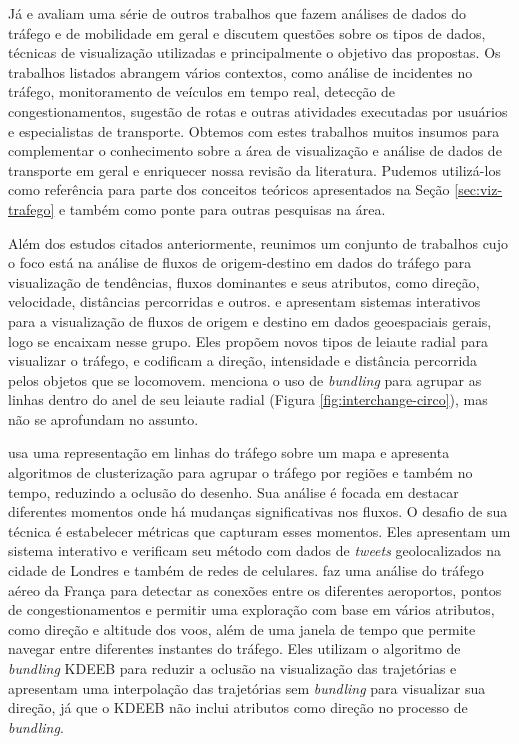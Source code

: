   Já \citet{Andrienko2017Visual} e \citet{Chen2015} avaliam uma série de outros
trabalhos que fazem análises de dados do tráfego e de mobilidade em geral e
discutem questões sobre os tipos de dados, técnicas de visualização utilizadas
e principalmente o objetivo das propostas. Os trabalhos listados abrangem
vários contextos, como análise de incidentes no tráfego, monitoramento de
veículos em tempo real, detecção de congestionamentos, sugestão de rotas e
outras atividades executadas por usuários e especialistas de transporte.
Obtemos com estes trabalhos muitos insumos para complementar o conhecimento
sobre a área de visualização e análise de dados de transporte em geral e
enriquecer nossa revisão da literatura. Pudemos utilizá-los como referência
para parte dos conceitos teóricos apresentados na Seção \ref{sec:viz-trafego} e
também como ponte para outras pesquisas na área.

  Além dos estudos citados anteriormente, reunimos um conjunto de trabalhos
cujo o foco está na análise de fluxos de origem-destino em dados do tráfego
para visualização de tendências, fluxos dominantes e seus atributos, como
direção, velocidade, distâncias percorridas e outros.  \citet{Zeng2013} e
\citet{Andrienko2017}  apresentam sistemas interativos para a visualização de
fluxos de origem e destino em dados geoespaciais gerais, logo se encaixam nesse
grupo. Eles propõem novos tipos de leiaute radial para visualizar o tráfego, e
codificam a direção, intensidade e distância percorrida pelos objetos que se
locomovem. \citet{Zeng2013} menciona o uso de \emph{bundling} para agrupar as
linhas dentro do anel de seu leiaute radial (Figura
\ref{fig:interchange-circo}), mas não se aprofundam no assunto.

 \citet{Landersberg2016} usa uma representação em linhas do tráfego sobre um
mapa e apresenta algoritmos de clusterização para agrupar o tráfego por regiões
e também no tempo, reduzindo a oclusão do desenho. Sua análise é focada em destacar diferentes momentos onde há
mudanças significativas nos fluxos. O desafio de sua técnica é estabelecer métricas
que capturam esses momentos.  Eles apresentam um sistema interativo e
verificam seu método com dados de \emph{tweets} geolocalizados na cidade de Londres e
também de redes de celulares. \citet{Klein2014} faz uma análise do tráfego aéreo
da França para detectar as conexões entre os diferentes aeroportos, pontos de
congestionamentos e permitir uma exploração com base em vários atributos, como
direção e altitude dos voos, além de uma janela de tempo que permite navegar
entre diferentes instantes do tráfego. Eles utilizam o algoritmo de
\emph{bundling} KDEEB para reduzir a oclusão na visualização das trajetórias
e apresentam uma interpolação das trajetórias sem \emph{bundling} para visualizar
sua direção, já que o KDEEB não inclui atributos como direção no processo de \emph{bundling}.

